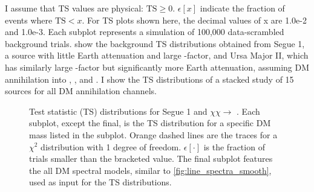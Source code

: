 I assume that TS values are physical: $ \mathrm{TS} \ge 0 $.
$\epsilon[x] $ indicate the fraction of events where $ \mathrm{TS} < x $. For TS plots shown here, the decimal values of x are 1.0e-2 and 1.0e-3.
Each subplot represents a simulation of 100,000 data-scrambled background trials.
 show the background TS distributions obtained from Segue 1, a source with little Earth attenuation and large \J-factor, and Ursa Major II, which has similarly large \J-factor but significantly more Earth attenuation, assuming DM annihilation into , \parpar{\tau}, and \parpar{\nu_\mu}.
I show the TS distributions of a stacked study of 15 sources for all DM annihilation channels.

\begin{figure}[!h]
    \caption{Test statistic (TS) distributions for Segue 1 and $\chi\chi \rightarrow$ . Each subplot, except the final, is the TS distribution for a specific DM mass listed in the subplot. Orange dashed lines are the traces for a $\chi^2$ distribution with 1 degree of freedom. $\epsilon[\cdot]$ is the fraction of trials smaller than the bracketed value. The final subplot features the all DM spectral models, similar to \cref{fig:line_spectra_smooth}, used as input for the TS distributions.}
    \label{fig:icDM_Seg1bb_TS}
\end{figure}

